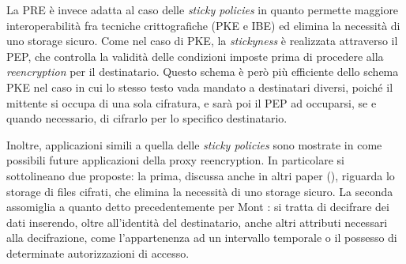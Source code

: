La PRE \`e invece adatta al caso delle \textit{sticky policies} in quanto permette maggiore interoperabilit\`a fra tecniche crittografiche (PKE e IBE) ed elimina la necessit\`a di uno storage sicuro. Come nel caso di PKE, la \textit{stickyness} \`e realizzata attraverso il PEP, che controlla la validit\`a delle condizioni imposte prima di procedere alla \textit{reencryption} per il destinatario. Questo schema \`e per\`o pi\`u efficiente dello schema PKE nel caso in cui lo stesso testo vada mandato a destinatari diversi, poich\'e il mittente si occupa di una sola cifratura, e sar\`a poi il PEP ad occuparsi, se e quando necessario, di cifrarlo per lo specifico destinatario.

Inoltre, applicazioni simili a quella delle \textit{sticky policies} sono mostrate in \cite{green2007identity} come possibili future applicazioni della proxy reencryption. In particolare si sottolineano due proposte: la prima, discussa anche in altri paper (), riguarda lo storage di files cifrati, che elimina la necessit\`a di uno storage sicuro. La seconda assomiglia a quanto detto precedentemente per Mont \cite{mont2003towards}: si tratta di decifrare dei dati inserendo, oltre all’identit\`a del destinatario, anche altri attributi necessari alla decifrazione, come l’appartenenza ad un intervallo temporale o il possesso di determinate autorizzazioni di accesso.
